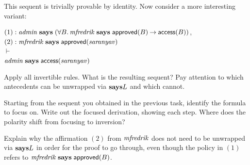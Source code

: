 \documentclass[11pt]{article}
\begin{document}
\begin{task}\rm
  \label{task:aff1}
  This sequent is trivially provable by identity.  Now consider a more
  interesting variant:
  \begin{tabbing}
    \quad $(1) : \mathit{admin} \mathrel{\mathbf{says}} (\forall B.\, \mathit{mfredrik} \mathrel{\mathbf{says}} \mathsf{approved}(B) \mathbin{\rightarrow} \mathsf{access}(B))$, \\
    \quad $(2) : \mathit{mfredrik} \mathrel{\mathbf{says}} \mathsf{approved}(\mathit{saranyav})$ \\[1ex]
    \quad $\vdash$ \\[1ex]
    \quad $\mathit{admin} \mathrel{\mathbf{says}} \mathsf{access}(\mathit{saranyav})$
  \end{tabbing}
  Apply all invertible rules.  What is the resulting sequent?  Pay attention
  to which antecedents can be unwrapped via $\mathbf{says}L$ and which cannot.
\end{task}

\begin{task}\rm
  \label{task:aff2}
  Starting from the sequent you obtained in the previous task, identify the
  formula to focus on.  Write out the focused derivation, showing each step.
  Where does the polarity shift from focusing to inversion?
\end{task}

\begin{task}\rm
  \label{task:aff3}
  Explain why the affirmation $(2)$ from $\mathit{mfredrik}$ does not need to be
  unwrapped via $\mathbf{says}L$ in order for the proof to go through, even though
  the policy in $(1)$ refers to $\mathit{mfredrik} \mathrel{\mathbf{says}} \mathsf{approved}(B)$.
\end{task}



\end{document}
